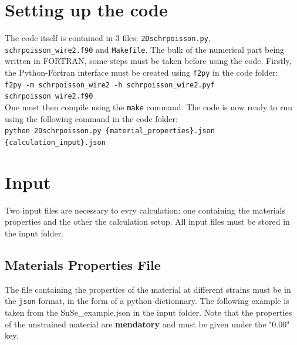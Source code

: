 \documentclass[a4paper,12pt]{article}
\begin{document}
\section{Setting up the code}
The code itself is contained in 3 files: \texttt{2Dschrpoisson.py}, \texttt{schrpoisson\_wire2.f90} and \texttt{Makefile}. The bulk of the numerical part being written in FORTRAN, some steps must be taken before using the code. Firstly, the Python-Fortran interface must be created using \texttt{f2py} in the code folder:\\

\texttt{f2py -m schrpoisson\_wire2 -h schrpoisson\_wire2.pyf schrpoisson\_wire2.f90} \\

One must then compile using the \texttt{make} command. The code is now ready to run using the following command in the code folder:\\

\texttt{python 2Dschrpoisson.py \{material\_properties\}.json  \{calculation\_input\}.json}

\section{Input}
Two input files are necessary to evry calculation: one containing the materials properties and the other the calculation setup. All input files must be stored in the input folder.
\subsection{Materials Properties File}
The file containing the properties of the material at different strains must be in the \texttt{json} format, in the form of a python dictionnary. The following example is taken from the SnSe\_example.json in the input folder. Note that the properties of the unstrained material are \textbf{mendatory} and must be given under the "0.00" key.\\
\end{document}

